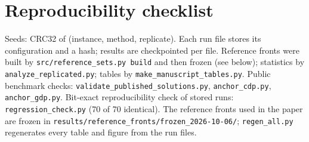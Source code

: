\section{Reproducibility checklist}\label{sec:reproducibility_checklist}

Seeds: CRC32 of (instance, method, replicate). Each run file stores its configuration and a hash; results are checkpointed per file. Reference fronts were built by \texttt{src/reference\_\allowbreak{}sets.py build} and then frozen (see below); statistics by \texttt{analyze\_\allowbreak{}replicated.py}; tables by \texttt{make\_\allowbreak{}manuscript\_\allowbreak{}tables.py}. Public benchmark checks: \texttt{validate\_\allowbreak{}published\_\allowbreak{}solutions.py}, \texttt{anchor\_\allowbreak{}cdp.py}, \texttt{anchor\_\allowbreak{}gdp.py}. Bit-exact reproducibility check of stored runs: \texttt{regression\_\allowbreak{}check.py} (70 of 70 identical). The reference fronts used in the paper are frozen in \texttt{results/reference\_\allowbreak{}fronts/frozen\_\allowbreak{}2026-10-06/}; \texttt{regen\_\allowbreak{}all.py} regenerates every table and figure from the run files.
